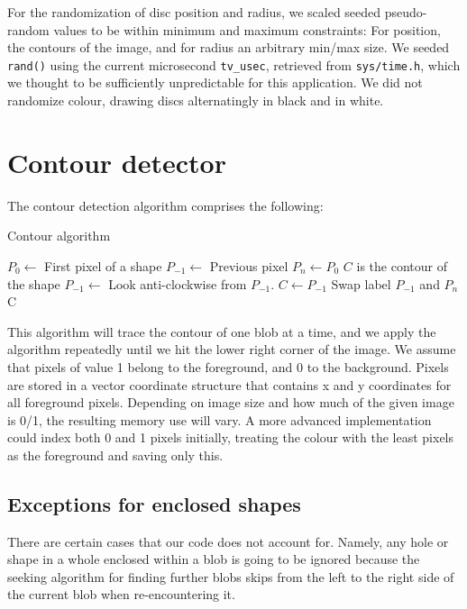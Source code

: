 \documentclass{article}
\begin{document}
	For the randomization of disc position and radius, we scaled seeded pseudo-random values to be within minimum and maximum constraints: For position, the contours of the image, and for radius an arbitrary min/max size. We seeded \texttt{rand()} using the current microsecond \texttt{tv\_usec}, retrieved from \texttt{sys/time.h}, which we thought to be sufficiently unpredictable for this application.
	We did not randomize colour, drawing discs alternatingly in black and in white.

	\section{Contour detector}
	
	The contour detection algorithm comprises the following:
	
	\begin{algorithm}[H]
		\caption{Contour algorithm}
		\begin{algorithmic}
			\State $P_0 \gets$ First pixel of a shape
			\State $P_{-1} \gets$ Previous pixel
			\State $P_n \gets P_0$
			\State $C$ is the contour of the shape
				\State $P_{-1} \gets$ Look anti-clockwise from $P_{-1}$.
					\State $C\gets P_{-1}$
					\State Swap label $P_{-1}$ and $P_n$
				\EndIf
			\EndWhile
			\State \Return C
		\end{algorithmic}
	\end{algorithm}
	This algorithm will trace the contour of one blob at a time, and we apply the algorithm repeatedly until we hit the lower right corner of the image.
	We assume that pixels of value 1 belong to the foreground, and 0 to the background. Pixels are stored in a vector coordinate structure that contains x and y coordinates for all foreground pixels.
	Depending on image size and how much of the given image is 0/1, the resulting memory use will vary.
	A more advanced implementation could index both 0 and 1 pixels initially, treating the colour with the least pixels as the foreground and saving only this.

	\subsection{Exceptions for enclosed shapes}

	There are certain cases that our code does not account for. Namely, any hole or shape in a whole enclosed within a blob is going to be ignored because the seeking algorithm for finding further blobs skips from the left to the right side of the current blob when re-encountering it.
\end{document}
